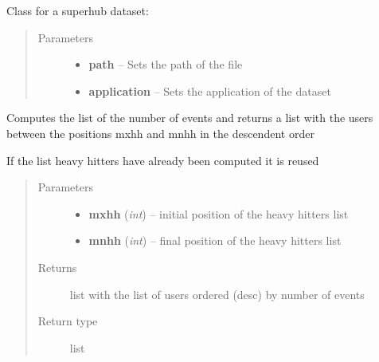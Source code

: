 \documentclass[letterpaper,10pt,english]{sphinxmanual}
\begin{document}
\begin{fulllineitems}
\label{index:SuperHub.STData.STData}
Class for a superhub dataset:
\begin{quote}\begin{description}
\item[{Parameters}] \leavevmode\begin{itemize}
\item {} 
\textbf{path} -- Sets the path of the file

\item {} 
\textbf{application} -- Sets the application of the dataset

\end{itemize}

\end{description}\end{quote}

\begin{fulllineitems}
\label{index:SuperHub.STData.STData.compute_heavy_hitters}
Computes the list of the number of events
and returns a list with the users between the
positions mxhh and mnhh in the descendent order

If the list heavy hitters have already been computed it is reused
\begin{quote}\begin{description}
\item[{Parameters}] \leavevmode\begin{itemize}
\item {} 
\textbf{mxhh} (\emph{int}) -- initial position of the heavy hitters list

\item {} 
\textbf{mnhh} (\emph{int}) -- final position of the heavy hitters list

\end{itemize}

\item[{Returns}] \leavevmode
list with the list of users ordered (desc) by number of events

\item[{Return type}] \leavevmode
list

\end{description}\end{quote}


\end{fulllineitems}
\end{fulllineitems}
\end{document}
